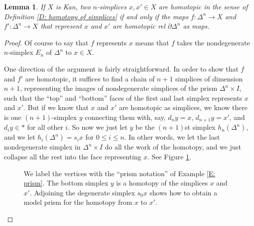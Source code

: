 \documentclass[12pt]{article}
\theoremstyle{plain}
\newtheorem{lemma}[theorem]{Lemma}
\theoremstyle{definition}
\theoremstyle{remark}
\newcommand{\bd}{\partial}
\begin{document}
\begin{lemma}\label{L: equiv. of homotopies}
If $X$ is Kan, two $n$-simplices $x,x'\in X$ are homotopic in the sense of Definition \ref{D: homotopy of simplices} if and only if the  maps $f\colon \Delta^n \to X$ and $f'\colon \Delta^n\to X$ that represent $x$ and $x'$ are homotopic rel $\bd \Delta^n$ as maps. 
\end{lemma}
\begin{proof}
Of course to say that $f$ represents $x$ means that $f$ takes the nondegenerate $n$-simplex $E_n$ of $\Delta^n$ to $x\in X$. 

One direction of the argument is fairly straightforward. In order to show that $f$ and $f'$ are homotopic, it suffices to find a chain of $n+1$ simplices of dimension $n+1$, representing the images of nondegenerate simplices of the prism $\Delta^n\times I$, such that the ``top'' and ``bottom'' faces of the first and last simplex represents $x$ and $x'$. But if we know that $x$ and $x'$ are homotopic as simplices, we know there is one $(n+1)$-simplex $y$ connecting them with, say, $d_ny=x$, $d_{n+1}y=x'$, and $d_iy\in *$ for all other $i$. So now we just let $y$ be the $(n+1)$st simplex $h_n(\Delta^n)$, and we let $h_i(\Delta^n)=s_ix$ for $0\leq i\leq n$. In other words, we let the last nondegenerate simplex in $\Delta^n\times I$ do all the work of the homotopy, and we just collapse all the rest into the face representing $x$. See Figure \ref{F: fig24}. 

\begin{figure}[!htp]
\begin{center}
\end{center}
\caption{We label the vertices with the ``prism notation'' of Example \ref{E: prism}. The bottom simplex $y$ is a homotopy of the simplices $x$ and $x'$. Adjoining the degenerate simplex $s_0x$ shows how to obtain a model prism for  the homotopy from $x$ to $x'$.}\label{F: fig24}
\end{figure}


\end{proof}
\end{document}

